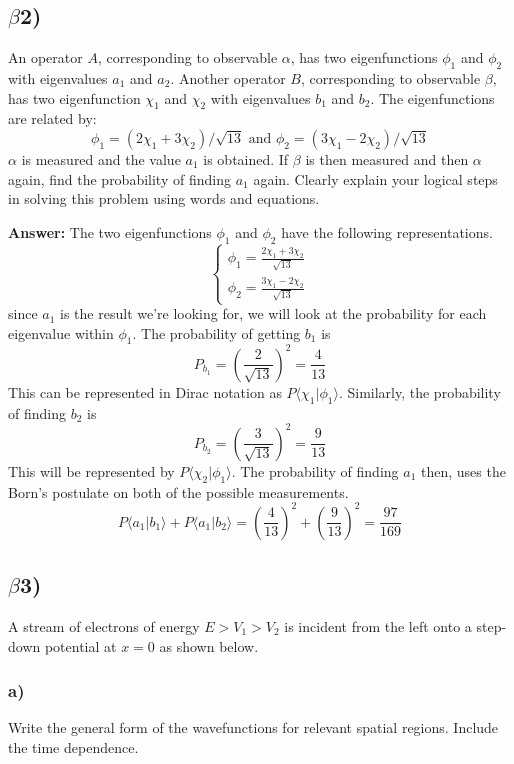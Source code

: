 \documentclass[10pt,letterpaper]{article}
\begin{document}
\subsection*{$\beta$2)}
\noindent An operator $A$, corresponding to observable $\alpha$, has two eigenfunctions $\phi_{1}$ and $\phi_{2}$ with eigenvalues $a_{1}$ and $a_{2}$. Another operator $B$, corresponding to observable $\beta$, has two eigenfunction $\chi_{1}$ and $\chi_{2}$ with eigenvalues $b_{1}$ and $b_{2}$. The eigenfunctions are related by: 
$$\phi_{1} = (2\chi_{1} + 3\chi_{2})/\sqrt{13} \text{ and } \phi_{2} = (3\chi_{1} - 2\chi_{2})/\sqrt{13}$$
$\alpha$ is measured and the value $a_{1}$ is obtained. If $\beta$ is then measured and then $\alpha$ again, find the probability of finding $a_{1}$ again. Clearly explain your logical steps in solving this problem using words and equations.

\textbf{Answer: }The two eigenfunctions $\phi_{1}$ and $\phi_{2}$ have the following representations.
$$\begin{cases}
	\phi_{1} = \frac{2\chi_{1} + 3\chi_{2}}{\sqrt{13}} \\
	\phi_{2} = \frac{3\chi_{1} - 2\chi_{2}}{\sqrt{13}}
\end{cases}$$
since $a_{1}$ is the result we're looking for, we will look at the probability for each eigenvalue within $\phi_{1}$. The probability of getting $b_{1}$ is
$$P_{b_{1}} = \left( \frac{2}{\sqrt{13}} \right)^{2} = \frac{4}{13}$$
This can be represented in Dirac notation as $P\langle \chi_{1} | \phi_{1} \rangle$. Similarly, the probability of finding $b_{2}$ is
$$P_{b_{2}} = \left( \frac{3}{\sqrt{13}} \right)^{2} = \frac{9}{13}$$
This will be represented by $P\langle \chi_{2} | \phi_{1} \rangle$. The probability of finding $a_{1}$ then, uses the Born's postulate on both of the possible measurements. 
$$P\langle a_{1} | b_{1} \rangle + P\langle a_{1} | b_{2} \rangle = \left( \frac{4}{13} \right)^{2} + \left( \frac{9}{13} \right)^{2} = \frac{97}{169}$$
\subsection*{$\beta$3)}
\noindent A stream of electrons of energy $E > V_{1} > V_{2}$ is incident from the left onto a step-down potential at $x = 0$ as shown below. 
\subsubsection*{a)}
\noindent Write the general form of the wavefunctions for relevant spatial regions. Include the time
dependence.
\end{document}
